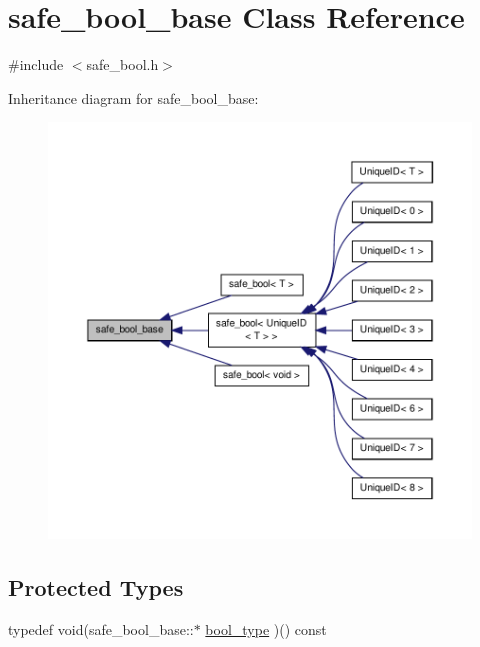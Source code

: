 \hypertarget{classsafe__bool__base}{\section{safe\-\_\-bool\-\_\-base Class Reference}
\label{classsafe__bool__base}
}


{\ttfamily \#include $<$safe\-\_\-bool.\-h$>$}



Inheritance diagram for safe\-\_\-bool\-\_\-base\-:\nopagebreak
\begin{figure}[H]
\begin{center}
\leavevmode
\includegraphics[width=350pt]{classsafe__bool__base__inherit__graph}
\end{center}
\end{figure}
\subsection*{Protected Types}
\begin{DoxyCompactItemize}
\item 
typedef void(safe\-\_\-bool\-\_\-base\-::$\ast$ \hyperlink{classsafe__bool__base_aae4e1a73eb4c4d1a43611bf32985e961}{bool\-\_\-type} )() const 
\end{DoxyCompactItemize}

